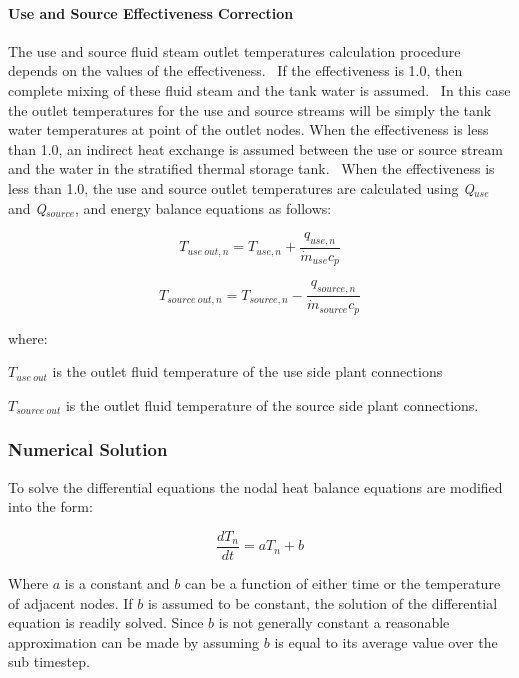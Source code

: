 \paragraph{Use and Source Effectiveness Correction}

The use and source fluid steam outlet temperatures calculation procedure depends on the values of the effectiveness.~ If the effectiveness is 1.0, then complete mixing of these fluid steam and the tank water is assumed.~ In this case the outlet temperatures for the use and source streams will be simply the tank water temperatures at point of the outlet nodes. When the effectiveness is less than 1.0, an indirect heat exchange is assumed between the use or source stream and the water in the stratified thermal storage tank.~ When the effectiveness is less than 1.0, the use and source outlet temperatures are calculated using \emph{Q\(_{use}\)} and \emph{Q\(_{source}\)}, and energy balance equations as follows:

\begin{equation}
{T_{use~out,n}} = {T_{use,n}} + \frac{{{q_{use,n}}}}{{{{\dot m}_{use}}{c_p}}}
\end{equation}

\begin{equation}
{T_{source~out,n}} = {T_{source,n}} - \frac{{{q_{source,n}}}}{{{{\dot m}_{source}}{c_p}}}
\end{equation}

where:

\(T_{use~out}\) is the outlet fluid temperature of the use side plant connections

\(T_{source~out}\) is the outlet fluid temperature of the source side plant connections.

\subsubsection{Numerical Solution}\label{numerical-solution}

To solve the differential equations the nodal heat balance equations are modified into the form:

\begin{equation}
  \frac{d{T_n}}{dt} = a T_n + b
\end{equation}

Where $a$ is a constant and $b$ can be a function of either time or the temperature of adjacent nodes. If $b$ is assumed to be constant, the solution of the differential equation is readily solved. Since $b$ is not generally constant a reasonable approximation can be made by assuming $b$ is equal to its average value over the sub timestep. 

